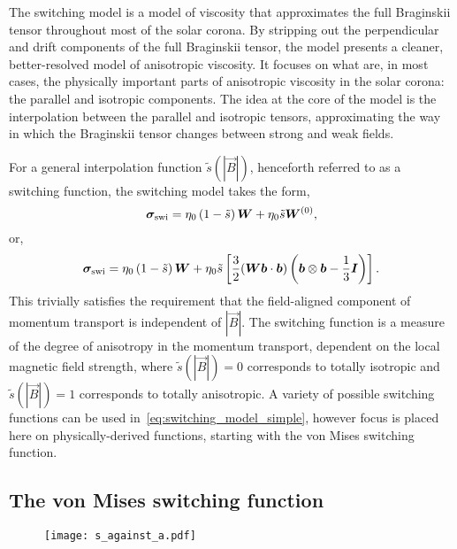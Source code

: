 The switching model is a model of viscosity that approximates the full Braginskii tensor throughout most of the solar corona. By stripping out the perpendicular and drift components of the full Braginskii tensor, the model presents a cleaner, better-resolved model of anisotropic viscosity. It focuses on what are, in most cases, the physically important parts of anisotropic viscosity in the solar corona: the parallel and isotropic components. The idea at the core of the model is the interpolation between the parallel and isotropic tensors, approximating the way in which the Braginskii tensor changes between strong and weak fields.

For a general interpolation function $\tilde{s}(|\vec{B}|)$, henceforth referred to as a switching function, the switching model takes the form,
\begin{equation}
  \label{eq:switching_model_simple}
{\bm \sigma}_{\text{swi}} = \eta_0 \left( 1 - \tilde{s} \right) {\bm W} + \eta_0 \tilde{s} {\bm W}^{(0)},
\end{equation}
or,
\begin{equation}
  \label{eq:switching_model}
{\bm \sigma}_{\text{swi}} = \eta_0 \left( 1 - \tilde{s} \right) {\bm W} + \eta_0 \tilde{s} \left[\frac{3}{2}({\bm W}{\bm b}\cdot{\bm b}) \left( {\bm b} \otimes {\bm b} - \frac{1}{3}{\bm I} \right)\right].
\end{equation}
This trivially satisfies the requirement that the field-aligned component of momentum transport is independent of $|\vec{B}|$. The switching function is a measure of the degree of anisotropy in the momentum transport, dependent on the local magnetic field strength, where $\tilde{s}(|\vec{B}|) = 0$ corresponds to totally isotropic and $\tilde{s}(|\vec{B}|) = 1$ corresponds to totally anisotropic. A variety of possible switching functions can be used in~\eqref{eq:switching_model_simple}, however focus is placed here on physically-derived functions, starting with the von Mises switching function.

\subsection{The von Mises switching function}

\label{sec:switching_function}

\begin{figure}[t]
  \centering
  \texttt{[image: s\_against\_a.pdf]}
  \label{fig:s_against_a}
\end{figure}

